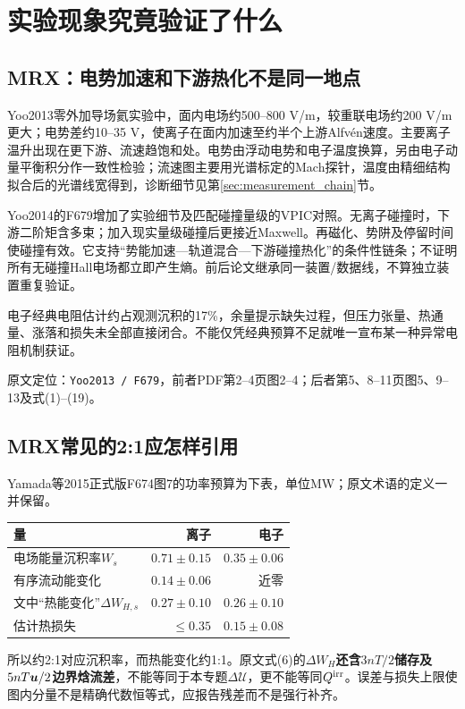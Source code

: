 \documentclass[UTF8,a4paper,11pt,openany,fontset=fandol]{ctexbook}
\newcommand{\loc}[2]{\par\noindent\textsf{原文定位：}\texttt{#1}，#2。\par}
\begin{document}
\chapter{实验现象究竟验证了什么}
\section{MRX：电势加速和下游热化不是同一地点}
Yoo2013零外加导场氦实验中，面内电场约500--800 V/m，较重联电场约200 V/m更大；电势差约10--35 V，使离子在面内加速至约半个上游Alfvén速度。主要离子温升出现在更下游、流速趋饱和处。电势由浮动电势和电子温度换算，另由电子动量平衡积分作一致性检验；流速图主要用光谱标定的Mach探针，温度由精细结构拟合后的光谱线宽得到，诊断细节见第\ref{sec:measurement_chain}节。\citep{Yoo2013}

Yoo2014的F679增加了实验细节及匹配碰撞量级的VPIC对照。无离子碰撞时，下游二阶矩含多束；加入现实量级碰撞后更接近Maxwell。再磁化、势阱及停留时间使碰撞有效。它支持“势能加速---轨道混合---下游碰撞热化”的条件性链条；不证明所有无碰撞Hall电场都立即产生熵。前后论文继承同一装置/数据线，不算独立装置重复验证。\citep{F679}

电子经典电阻估计约占观测沉积的17\%，余量提示缺失过程，但压力张量、热通量、涨落和损失未全部直接闭合。不能仅凭经典预算不足就唯一宣布某一种异常电阻机制获证。
\loc{Yoo2013 / F679}{前者PDF第2--4页图2--4；后者第5、8--11页图5、9--13及式(1)--(19)}

\section{MRX常见的2:1应怎样引用}
Yamada等2015正式版F674图7的功率预算为下表，单位MW；原文术语的定义一并保留。\citep{F674}
\begin{center}\begin{tabular}{P{74mm}rr}
\toprule 量 & 离子 & 电子\\\midrule
电场能量沉积率$W_s$ & $0.71\pm0.15$ & $0.35\pm0.06$\\
有序流动能变化 & $0.14\pm0.06$ & 近零\\
文中“热能变化”$\Delta W_{H,s}$ & $0.27\pm0.10$ & $0.26\pm0.10$\\
估计热损失 & $\leq0.35$ & $0.15\pm0.08$\\\bottomrule
\end{tabular}\end{center}
所以约2:1对应沉积率，而热能变化约1:1。原文式(6)的$\Delta W_H$\textbf{还含$3nT/2$储存及$5nT\bm{u}/2$边界焓流差}，不能等同于本专题$\Delta\mathcal U$，更不能等同$Q^{\rm irr}$。误差与损失上限使图内分量不是精确代数恒等式，应报告残差而不是强行补齐。
\end{document}
